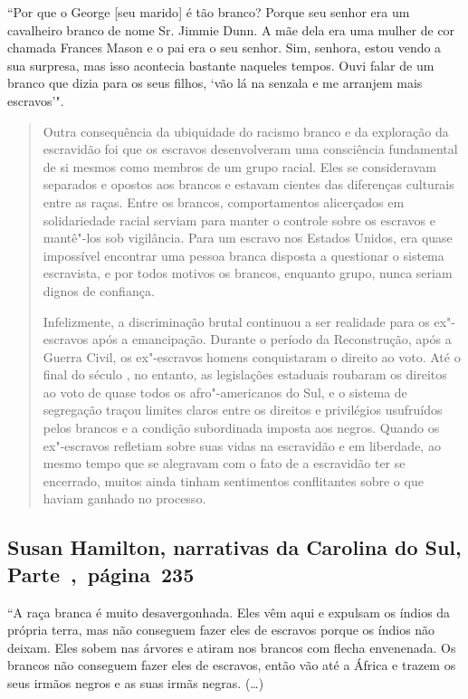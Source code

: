 ``Por que o George {[}seu marido{]} é tão branco? Porque seu senhor era
um cavalheiro branco de nome Sr. Jimmie Dunn. A mãe dela era uma mulher
de cor chamada Frances Mason e o pai era o seu senhor. Sim, senhora,
estou vendo a sua surpresa, mas isso acontecia bastante naqueles tempos.
Ouvi falar de um branco que dizia para os seus filhos, `vão lá na
senzala e me arranjem mais escravos'".

\begin{quote}
Outra consequência da ubiquidade do racismo branco e da exploração
da escravidão foi que os escravos desenvolveram uma consciência
fundamental de si mesmos como membros de um grupo racial. Eles se
consideravam separados e opostos aos brancos e estavam cientes das
diferenças culturais entre as raças. Entre os brancos, comportamentos
alicerçados em solidariedade racial serviam para manter o controle sobre
os escravos e mantê"-los sob vigilância. Para um escravo nos Estados
Unidos, era quase impossível encontrar uma pessoa branca disposta a
questionar o sistema escravista, e por todos motivos os brancos,
enquanto grupo, nunca seriam dignos de confiança.

Infelizmente, a discriminação brutal continuou a ser realidade
para os ex"-escravos após a emancipação. Durante o período da
Reconstrução, após a Guerra Civil, os ex"-escravos homens conquistaram o
direito ao voto. Até o final do século , no entanto, as legislações
estaduais roubaram os direitos ao voto de quase todos os afro"-americanos
do Sul, e o sistema de segregação traçou limites claros entre os
direitos e privilégios usufruídos pelos brancos e a condição subordinada
imposta aos negros. Quando os ex"-escravos refletiam sobre suas vidas na
escravidão e em liberdade, ao mesmo tempo que se alegravam com o fato de
a escravidão ter se encerrado, muitos ainda tinham sentimentos
conflitantes sobre o que haviam ganhado no processo.
\end{quote}

\subsection{Susan Hamilton, narrativas da Carolina do Sul, Parte~,~página~235}
\label{ref120}

``A raça branca é muito desavergonhada. Eles vêm aqui e expulsam os
índios da própria terra, mas não conseguem fazer eles de escravos porque
os índios não deixam. Eles sobem nas árvores e atiram nos brancos com
flecha envenenada. Os brancos não conseguem fazer eles de escravos,
então vão até a África e trazem os seus irmãos negros e as suas irmãs
negras. (\ldots{})

